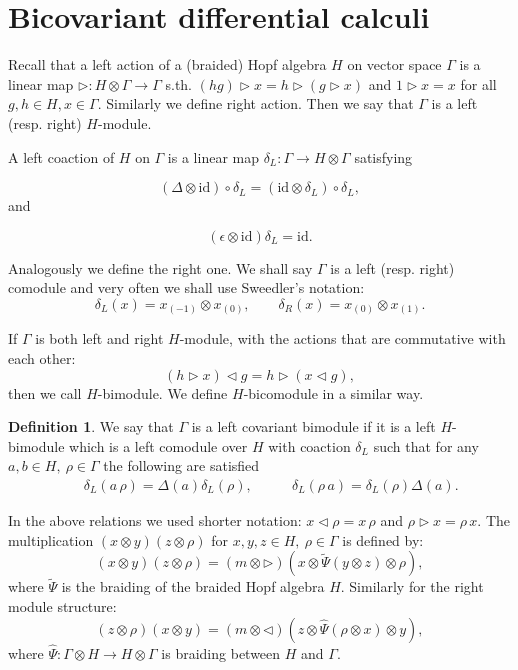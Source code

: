\documentclass[12pt]{amsart}
\theoremstyle{definition}
\newtheorem{defn}[thm]{Definition}
\numberwithin{equation}{section}
\newcommand{\ox}{\otimes}           %
\begin{document}
\section{Bicovariant differential calculi}

Recall that a left action of a (braided) Hopf algebra $H$ on vector space $\Gamma$ is a linear map $\rhd:H\otimes \Gamma\rightarrow \Gamma$ s.th. $(hg)\rhd x=h\rhd(g\rhd x)$ and $1\rhd x=x$ for all $g,h\in H, x\in \Gamma$. Similarly we define right action. Then we say that $\Gamma$ is a left (resp. right) $H$-module. 

 A left coaction of $H$ on $\Gamma$ is a linear map $\delta_L: \Gamma\rightarrow H\otimes \Gamma$ satisfying

$$ \left(\Delta\otimes \mathrm{id}\right)\circ 
\delta_L= \left(\mathrm{id}\otimes \delta_L\right)\circ\delta_L,$$ 
and 

$$\left(\epsilon\otimes \mathrm{id}\right)\delta_L=\mathrm{id}.$$

Analogously we define the right one. We shall say $\Gamma$ is a left (resp. right) comodule and very often we shall use Sweedler's notation:
$$ \delta_L (x) = x_{(-1)} \otimes x_{(0)}, \qquad  \delta_R (x) = x_{(0)} \otimes x_{(1)}. $$
 
If $\Gamma$ is both left and right $H$-module, with the actions that are commutative with each other:
$$ (h \rhd x) \lhd g = h \rhd (x \lhd g),$$
then we call $H$-bimodule. We define $H$-bicomodule in  a similar way.
  
\begin{defn}
We say that $\Gamma$ is a left covariant bimodule if it is a left $H$-bimodule which is a left comodule over $H$ with coaction $\delta_L$ such that for any $a,b\in H, \ \rho\in \Gamma$ the following are satisfied
$$
\begin{aligned}
&&\delta_L(a\,\rho)=\Delta(a) \delta_L(\rho), \qquad
&\delta_L(\rho \, a)=\delta_L(\rho)\Delta(a).
\end{aligned}
$$
\end{defn}
In the above relations we used shorter notation:
$x \lhd \rho = x\, \rho$ and $\rho \rhd x = \rho \, x$. The multiplication $(x\ox y)(z\ox \rho)$ for $x,y,z\in H,\ \rho\in \Gamma$ is defined by:
$$(x \ox y)(z\ox \rho)=(m\ox \rhd)(x\ox \tilde\Psi(y\ox z)\ox \rho),$$
where $\tilde{\Psi}$ is the braiding of the braided Hopf algebra $H$. 
Similarly for the right module structure:
$$(z \ox \rho) (x \ox y) = (m \ox \lhd)(z \ox \hat\Psi(\rho \ox x)\ox y),$$
where $\hat{\Psi}: \Gamma \otimes H \to H \otimes \Gamma$ is 
braiding between $H$ and $\Gamma$. 
\end{document}

